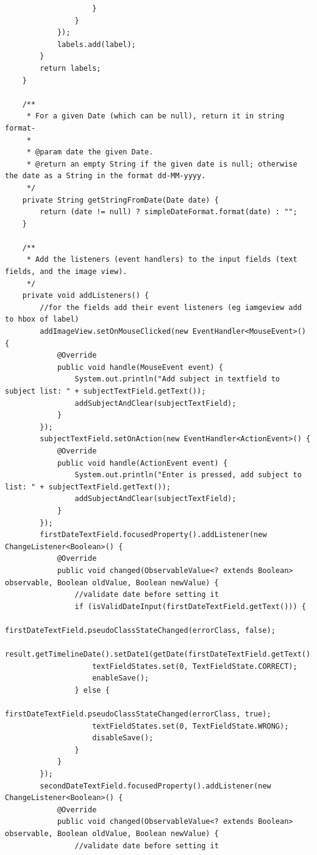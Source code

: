 \begin{lstlisting}
                    }
                }
            });
            labels.add(label);
        }
        return labels;
    }

    /**
     * For a given Date (which can be null), return it in string format-
     *
     * @param date the given Date.
     * @return an empty String if the given date is null; otherwise the date as a String in the format dd-MM-yyyy.
     */
    private String getStringFromDate(Date date) {
        return (date != null) ? simpleDateFormat.format(date) : "";
    }

    /**
     * Add the listeners (event handlers) to the input fields (text fields, and the image view).
     */
    private void addListeners() {
        //for the fields add their event listeners (eg iamgeview add to hbox of label)
        addImageView.setOnMouseClicked(new EventHandler<MouseEvent>() {
            @Override
            public void handle(MouseEvent event) {
                System.out.println("Add subject in textfield to subject list: " + subjectTextField.getText());
                addSubjectAndClear(subjectTextField);
            }
        });
        subjectTextField.setOnAction(new EventHandler<ActionEvent>() {
            @Override
            public void handle(ActionEvent event) {
                System.out.println("Enter is pressed, add subject to list: " + subjectTextField.getText());
                addSubjectAndClear(subjectTextField);
            }
        });
        firstDateTextField.focusedProperty().addListener(new ChangeListener<Boolean>() {
            @Override
            public void changed(ObservableValue<? extends Boolean> observable, Boolean oldValue, Boolean newValue) {
                //validate date before setting it
                if (isValidDateInput(firstDateTextField.getText())) {
                    firstDateTextField.pseudoClassStateChanged(errorClass, false);
                    result.getTimelineDate().setDate1(getDate(firstDateTextField.getText().trim()));
                    textFieldStates.set(0, TextFieldState.CORRECT);
                    enableSave();
                } else {
                    firstDateTextField.pseudoClassStateChanged(errorClass, true);
                    textFieldStates.set(0, TextFieldState.WRONG);
                    disableSave();
                }
            }
        });
        secondDateTextField.focusedProperty().addListener(new ChangeListener<Boolean>() {
            @Override
            public void changed(ObservableValue<? extends Boolean> observable, Boolean oldValue, Boolean newValue) {
                //validate date before setting it

\end{lstlisting}
